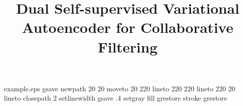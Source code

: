 %
%
%
%
%
\begin{filecontents*}{example.eps}
gsave
newpath
  20 20 moveto
  20 220 lineto
  220 220 lineto
  220 20 lineto
closepath
2 setlinewidth
gsave
  .4 setgray fill
grestore
stroke
grestore
\end{filecontents*}
%
\RequirePackage{fix-cm}
%
\documentclass[smallextended]{svjour3}       %
%
\smartqed  %
%
\usepackage{subfigure} %
\usepackage[normalem]{ulem}
\usepackage{bbm}
\useunder{\uline}{\ul}{}
\usepackage{graphicx}
\usepackage{algorithmic}
\usepackage{algorithm}
\usepackage{amsmath,amsfonts,amssymb,amsbsy,bm,paralist,theorem,ifthen,color}
\usepackage{xcolor}
\usepackage{multirow}
\usepackage[numbers]{natbib}
\usepackage[misc]{ifsym}
\usepackage{footmisc} 
\usepackage{subfigure} %
\usepackage[normalem]{ulem}
\useunder{\uline}{\ul}{}
%
%
%
%
%


\title{Dual Self-supervised Variational Autoencoder for Collaborative Filtering}



